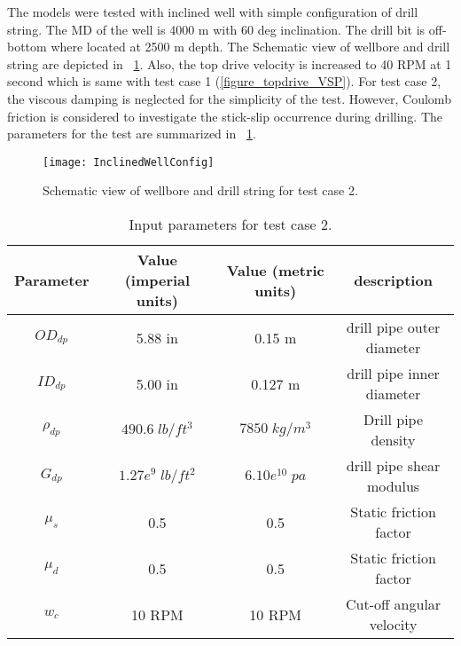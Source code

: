 The models were tested with inclined well with simple configuration of drill string. The MD of the well is 4000 m with 60 deg inclination. The drill bit is off-bottom where located at 2500 m depth. The Schematic view of wellbore and drill string are depicted in \figurename~\ref{figure_wellconfig_inclined}. Also, the top drive velocity is increased to 40 RPM at 1 second which is same with test case 1 (\figurename\ref{figure_topdrive_VSP}). For test case 2, the viscous damping is neglected for the simplicity of the test. However, Coulomb friction is considered to investigate the stick-slip occurrence during drilling. The parameters for the test are summarized in \tablename~\ref{table_Inclinedwell_input}.

\begin{figure}[!hbt]
  \centering
  \texttt{[image: InclinedWellConfig]}
  \caption[Schematic view of test case 2.]{Schematic view of wellbore and drill string for test case 2.}\label{figure_wellconfig_inclined}
\end{figure}

 \begin{table}[!hbt]
\centering
\begin{tabular}{|c|c|c|c|}
\hline
Parameter & Value (imperial units) & Value (metric units) & description\\                                                              
\hline
$OD_{dp}$ & 5.88 in & 0.15 m & drill pipe outer diameter\\                                                       
\hline
$ID_{dp}$ & 5.00 in & 0.127 m & drill pipe inner diameter  \\                                                      
\hline
$\rho_{dp}$ & $490.6\;lb/ft^3$ & $7850\;kg/m^3$ & Drill pipe density \\                                                  
\hline
$G_{dp}$ & $1.27e^{9}\;lb/ft^2$ & $6.10e^{10}\;pa$ & drill pipe shear modulus\\                                                              
\hline
$\mu_{s}$ & 0.5 & 0.5 & Static friction factor\\
\hline
$\mu_{d}$ & 0.5 & 0.5 & Static friction factor\\
\hline
$w_c$ & 10 RPM & 10 RPM & Cut-off angular velocity\\
\hline
\end{tabular}
\caption[Input parameters for test case 2.]{Input parameters for test case 2.}\label{table_Inclinedwell_input}
\end{table}

